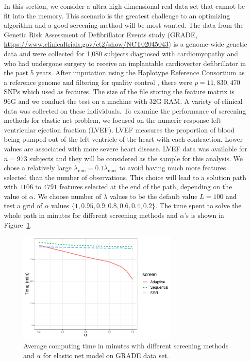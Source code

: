 In this section, we consider a ultra high-dimensional real data set that cannot be fit into the memory. This scenario is the greatest challenge to an optimizing algorithm and a good screening method will be most wanted. The data from the Genetic Risk Assessment of Defibrillator Events study (GRADE, \url{https://www.clinicaltrials.gov/ct2/show/NCT02045043}) is a genome-wide genetic data and were collected for 1,080 subjects diagnosed with cardiomyopathy and who had undergone surgery to receive an implantable cardioverter defibrillator in the past 5 years. After imputation using the Haplotype Reference Consortium as a reference genome and filtering for quality control \citep{Das2016}, there were $p=11,830,470$ SNPs which used as features. The size of the file storing the feature matrix is 96G and we conduct the test on a machine with 32G RAM. A variety of clinical data was collected on these individuals. To examine the performance of screening methods for elastic net problem, we focused on the numeric response left ventricular ejection fraction (LVEF). LVEF measures the proportion of blood being pumped out of the left ventricle of the heart with each contraction. Lower values are associated with more severe heart disease. LVEF data was available for $n=973$ subjects and they will be considered as the sample for this analysis. We chose a relatively large $\lambda_{\min} =0.1\lambda_{\max}$ to avoid having much more features selected than the number of observations. This choice will lead to a solution path with $1106$ to $4791$ features selected at the end of the path, depending on the value of $\alpha$. We choose number of $\lambda$ values to be the default value $L=100$ and test a grid of $\alpha$ values $\{1,0.95,0.9,0.8,0.6,0.4,0.2\}$. The time spent to solve the whole path in minutes for different screening methods and $\alpha$'s is shown in Figure~\ref{fig:lvef}. 

\begin{figure}[ht]
    \centering
    \includegraphics[width=0.72\textwidth]{enetlvef.pdf}    \caption{Average computing time in minutes with different screening methods and $\alpha$ for elastic net model on GRADE data set.}
    \label{fig:lvef}
\end{figure}

